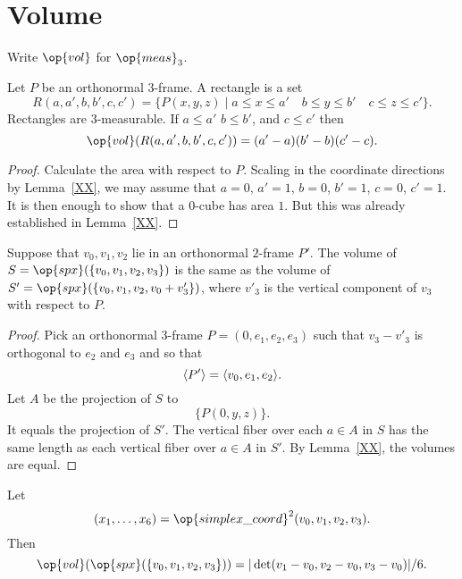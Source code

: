 \section{Volume}

Write $\op{vol}$ for $\op{meas}_3$.

\begin{lemma}
Let $P$ be an orthonormal $3$-frame.  A rectangle is a set
    $$R(a,a',b,b',c,c') = \{ P(x,y,z) \mid a \le x \le a'\quad b\le y\le b'\quad
    c\le z \le c'\}.$$
Rectangles are $3$-measurable. If $a\le a'$  $b\le b'$, and $c\le
c'$ then
    $$\op{vol}(R(a,a',b,b',c,c')) = (a'-a)(b'-b)(c'-c).$$
\end{lemma}

\begin{proof} Calculate the area with respect to $P$.  Scaling in
the coordinate directions by Lemma~\ref{XX}, we may assume that
$a=0$, $a'=1$, $b=0$, $b'=1$, $c=0$, $c'=1$.  It is then enough to
show that a $0$-cube has area $1$.  But this was already established
in Lemma~\ref{XX}.
\end{proof}


\begin{lemma} Suppose that $v_0,v_1,v_2$ lie in an orthonormal $2$-frame $P'$.
The volume of $S=\op{spx}(\{v_0,v_1,v_2,v_3\})$ is the same as the
volume of $S'=\op{spx}(\{v_0,v_1,v_2,v_0+ v'_3\})$, where $v'_3$ is
the vertical component of $v_3$ with respect to $P$.
\end{lemma}


\begin{proof} Pick an orthonormal $3$-frame $P = (0,e_1,e_2,e_3)$ such that
$v_3 - v'_3$ is orthogonal to $e_2$ and $e_3$ and so that
$${\langle P'\rangle} = {\langle v_0,e_1,e_2\rangle}.$$
Let $A$ be the projection of $S$ to
    $$\{P(0,y,z)\}.$$
It equals the projection of $S'$.  The vertical fiber over each
$a\in A$ in $S$ has the same length as each vertical fiber over
$a\in A$ in $S'$.  By Lemma~\ref{XX}, the volumes are equal.
\end{proof}




\begin{lemma} Let $$(x_1,\ldots,x_6) = \op{simplex\_coord}^2(v_0,v_1,v_2,v_3).$$
Then
    $$\op{vol}(\op{spx}(\{v_0,v_1,v_2,v_3\})) =
    |\det(v_1-v_0,v_2-v_0,v_3-v_0)|/6.$$
\end{lemma}

